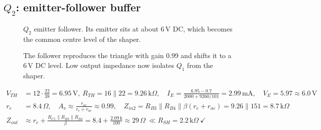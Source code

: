 \subsection{$Q_2$: emitter-follower buffer}
\begin{figure}[H]
\centering
{}
\caption{$Q_2$ emitter follower. Its emitter sits at about 6\,V DC, which becomes the common centre level of the shaper.}
\end{figure}

\begin{figure}[H]
\centering
{}
\caption{The follower reproduces the triangle with gain 0.99 and shifts it to a 6\,V DC level. Low output impedance now isolates $Q_1$ from the shaper.}
\end{figure}

\begin{tcolorbox}[colback=blue!3,colframe=blue!40!black,title=Calculations,fonttitle=\small\bfseries,boxrule=0.4pt]
\small
\begin{align*}
V_{TH}&=12\cdot\tfrac{22}{38}=6.95\,\mathrm V,\ R_{TH}=16\parallel22=9.26\,\mathrm{k}\Omega,\quad I_E=\frac{6.95-0.7}{2000+9260/101}=2.99\,\mathrm{mA},\quad V_E=5.97\approx6.0\,\mathrm V\\
r_e&=8.4\,\Omega,\quad A_v\approx\frac{r_{ac}}{r_e+r_{ac}}\approx0.99,\quad Z_{in2}=R_{B3}\parallel R_{B4}\parallel\beta(r_e+r_{ac})=9.26\parallel151=8.7\,\mathrm{k}\Omega\\
Z_{out}&\approx r_e+\frac{R_{C1}\parallel R_{B3}\parallel R_{B4}}{\beta}=8.4+\frac{2.09\,\mathrm k}{100}\approx29\,\Omega\ \ll R_{SH}=2.2\,\mathrm{k}\Omega\ \checkmark
\end{align*}
\end{tcolorbox}

